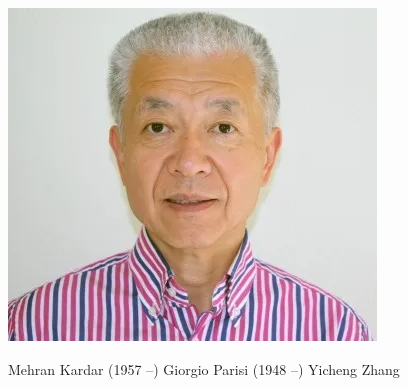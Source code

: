 \documentclass[9pt,table,xcolor=dvipsnames]{beamer}
\begin{document}
\begin{frame}[fragile]
\begin{center}
    \includegraphics[scale=0.28]{figs/Zhang.jpg}
  \end{center}

  \small
  \quad Mehran Kardar (1957 --) \:\:  Giorgio Parisi (1948 --) \qquad\qquad Yicheng Zhang

\end{frame}
\end{document}

